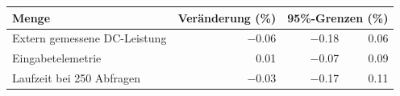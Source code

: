 \begin{tabular}{@{}lrrr@{}}
\toprule
Menge & Veränderung (\%) & \multicolumn{2}{c}{95\%-Grenzen (\%)} \\
\midrule
Extern gemessene DC-Leistung & \num{-0.06} & \num{-0.18} & \num{+0.06} \\
Eingabetelemetrie & \num{+0.01} & \num{-0.07} & \num{+0.09} \\
Laufzeit bei 250 Abfragen & \num{-0.03} & \num{-0.17} & \num{+0.11} \\
\bottomrule
\end{tabular}
